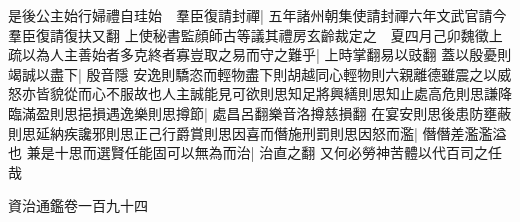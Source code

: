 是後公主始行婦禮自珪始　羣臣復請封禪|{
	五年諸州朝集使請封禪六年文武官請今羣臣復請復扶又翻}
上使秘書監顔師古等議其禮房玄齡裁定之　夏四月己卯魏徵上疏以為人主善始者多克終者寡豈取之易而守之難乎|{
	上時掌翻易以豉翻}
蓋以殷憂則竭誠以盡下|{
	殷音隱}
安逸則驕恣而輕物盡下則胡越同心輕物則六親離德雖震之以威怒亦皆貌從而心不服故也人主誠能見可欲則思知足將興繕則思知止處高危則思謙降臨滿盈則思挹損遇逸樂則思撙節|{
	處昌呂翻樂音洛撙慈損翻}
在宴安則思後患防壅蔽則思延納疾讒邪則思正己行爵賞則思因喜而僭施刑罰則思因怒而濫|{
	僭僭差濫濫溢也}
兼是十思而選賢任能固可以無為而治|{
	治直之翻}
又何必勞神苦體以代百司之任哉

資治通鑑卷一百九十四
